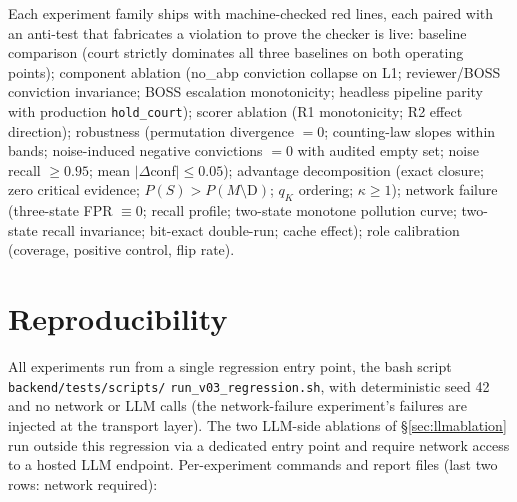 \documentclass[11pt]{article}
\newcommand{\dd}{\mathrm{D}}
\begin{document}
Each experiment family ships with machine-checked red lines, each paired
with an anti-test that fabricates a violation to prove the checker is live:
baseline comparison (court strictly dominates all three baselines on both
operating points); component ablation (no\_abp conviction collapse on L1;
reviewer/BOSS conviction invariance; BOSS escalation monotonicity; headless
pipeline parity with production \texttt{hold\_court}); scorer ablation
(R1 monotonicity; R2 effect direction); robustness (permutation
divergence $=0$; counting-law slopes within bands; noise-induced negative
convictions $=0$ with audited empty set; noise recall $\geq 0.95$; mean
$|\Delta$conf$| \leq 0.05$); advantage decomposition (exact closure;
zero critical evidence; $P(S) > P(M{\setminus}\dd)$; $q_K$ ordering;
$\kappa\geq1$); network failure (three-state FPR $\equiv 0$; recall
profile; two-state monotone pollution curve; two-state recall
invariance; bit-exact double-run; cache effect); role calibration
(coverage, positive control, flip rate).

\section{Reproducibility}\label{app:repro}

All experiments run from a single regression entry point, the bash script
\texttt{backend/tests/scripts/} \linebreak
\texttt{run\_v03\_regression.sh}, with
deterministic seed 42 and no network or LLM calls (the network-failure
experiment's failures are injected at the transport layer). The two
LLM-side ablations of \S\ref{sec:llmablation} run outside this regression
via a dedicated entry point and require network access to a hosted LLM
endpoint. Per-experiment commands and report files (last two rows: network
required):
\end{document}
